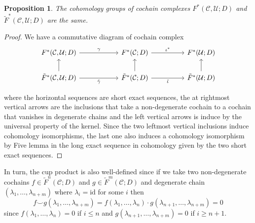 \documentclass[12pt,reqno]{amsart}
\newtheorem{prop}[teo]{Proposition}
\theoremstyle{definition}
\theoremstyle{remark}
\numberwithin{figure}{section}%
\newcommand{\CC}{\mathcal{C}}
\newcommand{\id}{\mathrm{id}}
\newcommand{\Uc}{\mathcal{U}}
\begin{document}
\begin{prop}
    The cohomology groups of cochain complexes $F^*(\CC,\Uc;D)$ and $\tilde F^*(\CC,\Uc;D)$ are the same.
\end{prop}
\begin{proof}
    We have a commutative diagram of cochain complex%
\[\begin{tikzcd}
	{F^*(\CC,\Uc;D)} & {} & {F^*(\CC;D)} && {F^*(\Uc;D)} \\
	{\tilde F^*(\CC,\Uc;D)} && {\tilde F^*(\CC;D)} && {\tilde F^*(\Uc;D)}
	\arrow["\gamma", from=1-1, to=1-3]
	\arrow["{\iota^*}", from=1-3, to=1-5]
	\arrow[from=2-1, to=1-1]
	\arrow["{\tilde \gamma}"', from=2-1, to=2-3]
	\arrow[from=2-3, to=1-3]
	\arrow["{\tilde \iota}"', from=2-3, to=2-5]
	\arrow[from=2-5, to=1-5]
\end{tikzcd}\]

where the horizontal sequences are short exact sequences, the at rightmost
vertical arrows are the inclusions that take a non-degenerate cochain to a cochain that vanishes in degenerate chains and the left vertical arrows is induce by the universal property of the kernel. Since the two leftmost vertical inclusions induce cohomology isomorphisms, the last one also induces a cohomology isomorphism by Five lemma in the long exact sequence in cohomology given by the two short exact sequences.
\end{proof}

In turn, the cup product is also well-defined since if we take two non-degenerate cochains $f\in \tilde F^n(\CC;D)$ and $g \in \tilde F^m(\CC;D)$ and degenerate chain $(\lambda_1,\dots,\lambda_{n+m})$ where $\lambda_i=\id$ for some $i$ then
$$f\smile g (\lambda_1,\dots,\lambda_{n+m})=f(\lambda_1,\dots,\lambda_{n}) \cdot g(\lambda_{n+1},\dots,\lambda_{n+m})=0$$
since $f(\lambda_1,\dots,\lambda_{n})=0$ if $i\leq n$ and $g(\lambda_{n+1},\dots,\lambda_{n+m})=0$ if $i\geq n+1$.

\end{document}
